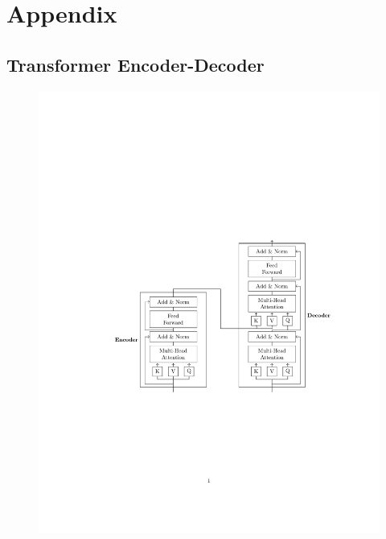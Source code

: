 \documentclass[landscape]{article}
\begin{document}
\cp
\thispagestyle{empty}
\section*{Appendix}
\vspace*{10mm}
\subsection*{Transformer Encoder-Decoder}
\vspace*{-15mm}

\begin{figure}[!htp]
\centering
\includegraphics[trim=4cm 8cm 3cm 8cm, scale=1.35, clip]{figures/transformer_encoder_decoder}
\end{figure}

\cp
\thispagestyle{empty}
\end{document}
